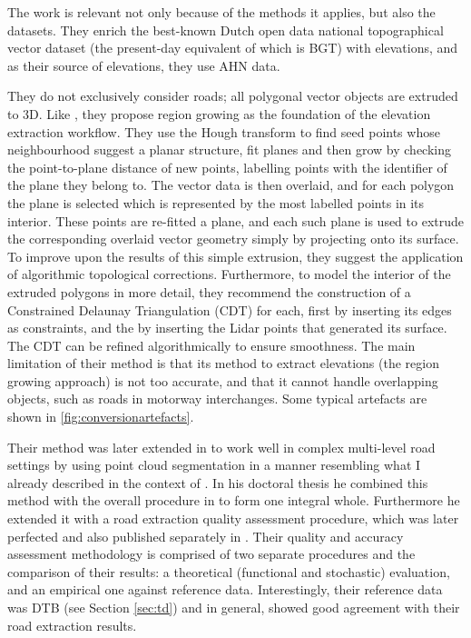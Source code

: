 The work \cite{oudeElberink_vosselman_2006} is relevant not only because of the methods it applies, but also the datasets. They enrich the best-known Dutch open data national topographical vector dataset (the present-day equivalent of which is BGT) with elevations, and as their source of elevations, they use AHN data.

They do not exclusively consider roads; all polygonal vector objects are extruded to 3D. Like \cite{hatger_brenner_2003}, they propose region growing as the foundation of the elevation extraction workflow. They use the Hough transform to find seed points whose neighbourhood suggest a planar structure, fit planes and then grow by checking the point-to-plane distance of new points, labelling points with the identifier of the plane they belong to. The vector data is then overlaid, and for each polygon the plane is selected which is represented by the most labelled points in its interior. These points are re-fitted a plane, and each such plane is used to extrude the corresponding overlaid vector geometry simply by projecting onto its surface. To improve upon the results of this simple extrusion, they suggest the application of algorithmic topological corrections. Furthermore, to model the interior of the extruded polygons in more detail, they recommend the construction of a Constrained Delaunay Triangulation (CDT) for each, first by inserting its edges as constraints, and the by inserting the Lidar points that generated its surface. The CDT can be refined algorithmically to ensure smoothness. The main limitation of their method is that its method to extract elevations (the region growing approach) is not too accurate, and that it cannot handle overlapping objects, such as roads in motorway interchanges. Some typical artefacts are shown in \ref{fig:conversionartefacts}.

Their method was later extended in \cite{oudeElberink_vosselman_2009} to work well in complex multi-level road settings by using point cloud segmentation in a manner resembling what I already described in the context of \cite{boyko_funkhauser_2011}. In his doctoral thesis \cite{oudeElberink_2010} he combined this method with the overall procedure in \cite{oudeElberink_vosselman_2006} to form one integral whole. Furthermore he extended it with a road extraction quality assessment procedure, which was later perfected and also published separately in \cite{oudeElberink_vosselman_2012}. Their quality and accuracy assessment methodology is comprised of two separate procedures and the comparison of their results: a theoretical (functional and stochastic) evaluation, and an empirical one against reference data. Interestingly, their reference data was DTB (see Section \ref{sec:td}) and in general, showed good agreement with their road extraction results.

